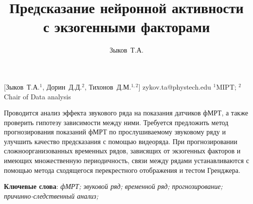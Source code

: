 \documentclass[12pt, twoside]{article}
\begin{document}
\title
    [Предсказание нейронной активности с экзогенными факторами] %
    {Предсказание нейронной активности с экзогенными факторами}
\author
    [Зыков Т.А.] %
    {Зыков~Т.А.} %
    [Зыков~Т.А.$^1$, Дорин~Д.Д.$^2$, Тихонов~Д.М.$^{1, 2}$] %
\email
    {zykov.ta@phystech.edu}
\organization
    {$^1$MIPT; $^2$Chair of Data analysis}
\abstract
    {%

    Проводится анализ эффекта звукового ряда на показания датчиков фМРТ, а также проверить гипотезу зависимости между ними. Требуется предложить метод прогнозирования показаний фМРТ по прослушиваемому звуковому ряду и улучшить качество предсказания с помощью видеоряда. При прогнозировании сложноорганизованных временных рядов, зависящих от экзогенных факторов и имеющих множественную периодичность, связи между рядами устанавливаются с помощью метода сходящегося перекрестного отображения и тестом Гренджера. 
    
	
	
 	
	
\bigskip
\noindent
\textbf{Ключевые слова}: \emph {фМРТ; звуковой ряд; временной ряд; прогнозирование; причинно-следственный анализ;}
}
\end{document}
